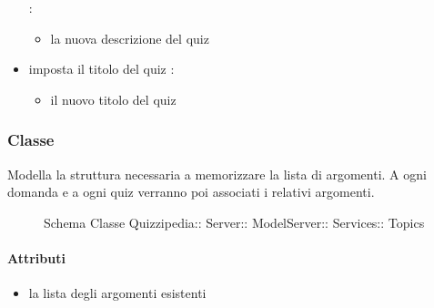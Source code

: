 \begin{itemize}
 :
\begin{itemize}
\item {}
\newline
la nuova descrizione del quiz
\end{itemize}
\item {}
\newline
imposta il titolo del quiz
\newline
{} :
\begin{itemize}
\item {}
\newline
il nuovo titolo del quiz
\end{itemize}
\end{itemize}
\subsubsection{Classe }
Modella la struttura necessaria a memorizzare la lista di argomenti. A ogni domanda e a ogni quiz verranno poi associati i relativi argomenti.
\begin{figure}[H]
\centering
\noindent{}
\caption[Schema Classe Topics]{Schema Classe Quizzipedia:: Server:: ModelServer:: Services:: Topics}
\end{figure}
\paragraph{Attributi}
\begin{itemize}
\item {}
\newline
la lista degli argomenti esistenti
\end{itemize}
